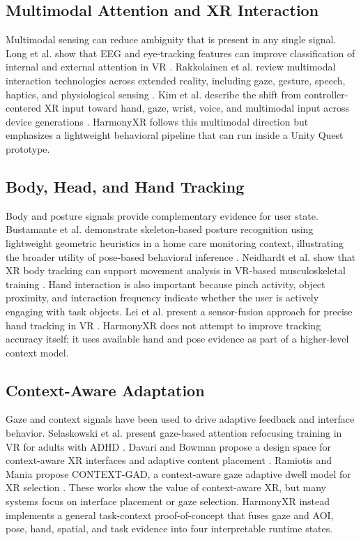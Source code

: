 \documentclass[conference]{IEEEtran}
\begin{document}
\subsection{Multimodal Attention and XR Interaction}
Multimodal sensing can reduce ambiguity that is present in any single signal. Long et al. show that EEG and eye-tracking features can improve classification of internal and external attention in VR \cite{long2024multimodal}. Rakkolainen et al. review multimodal interaction technologies across extended reality, including gaze, gesture, speech, haptics, and physiological sensing \cite{rakkolainen2021technologies}. Kim et al. describe the shift from controller-centered XR input toward hand, gaze, wrist, voice, and multimodal input across device generations \cite{kim2026controllers}. HarmonyXR follows this multimodal direction but emphasizes a lightweight behavioral pipeline that can run inside a Unity Quest prototype.

\subsection{Body, Head, and Hand Tracking}
Body and posture signals provide complementary evidence for user state. Bustamante et al. demonstrate skeleton-based posture recognition using lightweight geometric heuristics in a home care monitoring context, illustrating the broader utility of pose-based behavioral inference \cite{bustamante2025skeleton}. Neidhardt et al. show that XR body tracking can support movement analysis in VR-based musculoskeletal training \cite{neidhardt2023body}. Hand interaction is also important because pinch activity, object proximity, and interaction frequency indicate whether the user is actively engaging with task objects. Lei et al. present a sensor-fusion approach for precise hand tracking in VR \cite{lei2023hand}. HarmonyXR does not attempt to improve tracking accuracy itself; it uses available hand and pose evidence as part of a higher-level context model.

\subsection{Context-Aware Adaptation}
Gaze and context signals have been used to drive adaptive feedback and interface behavior. Selaskowski et al. present gaze-based attention refocusing training in VR for adults with ADHD \cite{selaskowski2023gaze}. Davari and Bowman propose a design space for context-aware XR interfaces and adaptive content placement \cite{davari2024context}. Ramiotis and Mania propose CONTEXT-GAD, a context-aware gaze adaptive dwell model for XR selection \cite{ramiotis2025contextgad}. These works show the value of context-aware XR, but many systems focus on interface placement or gaze selection. HarmonyXR instead implements a general task-context proof-of-concept that fuses gaze and AOI, pose, hand, spatial, and task evidence into four interpretable runtime states.
\end{document}

